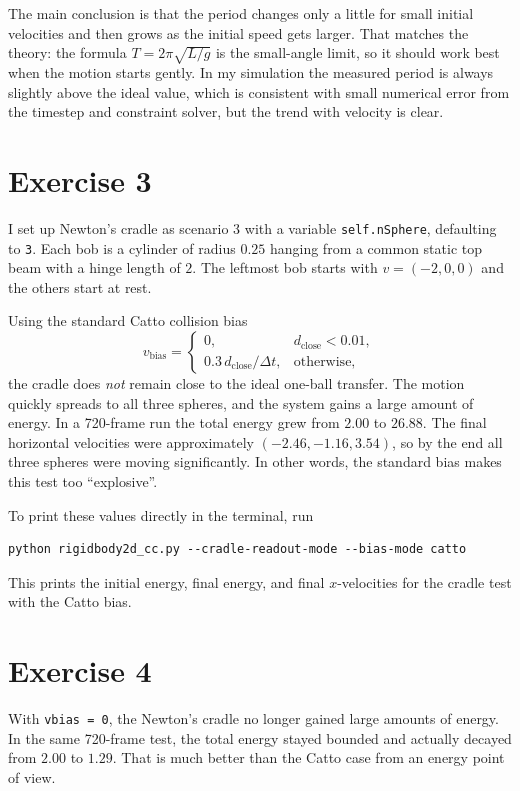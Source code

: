 \documentclass[11pt]{article}
\begin{document}
The main conclusion is that the period changes only a little for small initial velocities and then grows as the initial speed gets larger. That matches the theory: the formula $T=2\pi\sqrt{L/g}$ is the small-angle limit, so it should work best when the motion starts gently. In my simulation the measured period is always slightly above the ideal value, which is consistent with small numerical error from the timestep and constraint solver, but the trend with velocity is clear.

\section*{Exercise 3}
I set up Newton's cradle as scenario 3 with a variable \texttt{self.nSphere}, defaulting to \texttt{3}. Each bob is a cylinder of radius $0.25$ hanging from a common static top beam with a hinge length of $2$. The leftmost bob starts with $v=(-2,0,0)$ and the others start at rest.

Using the standard Catto collision bias
\[
v_{\text{bias}}=
\begin{cases}
0, & d_{\text{close}} < 0.01,\\
0.3\, d_{\text{close}}/\Delta t, & \text{otherwise},
\end{cases}
\]
the cradle does \emph{not} remain close to the ideal one-ball transfer. The motion quickly spreads to all three spheres, and the system gains a large amount of energy. In a 720-frame run the total energy grew from $2.00$ to $26.88$. The final horizontal velocities were approximately $(-2.46,-1.16,3.54)$, so by the end all three spheres were moving significantly. In other words, the standard bias makes this test too ``explosive''.

To print these values directly in the terminal, run
\begin{verbatim}
python rigidbody2d_cc.py --cradle-readout-mode --bias-mode catto
\end{verbatim}
This prints the initial energy, final energy, and final $x$-velocities for the cradle test with the Catto bias.

\section*{Exercise 4}
With \texttt{vbias = 0}, the Newton's cradle no longer gained large amounts of energy. In the same 720-frame test, the total energy stayed bounded and actually decayed from $2.00$ to $1.29$. That is much better than the Catto case from an energy point of view.
\end{document}
